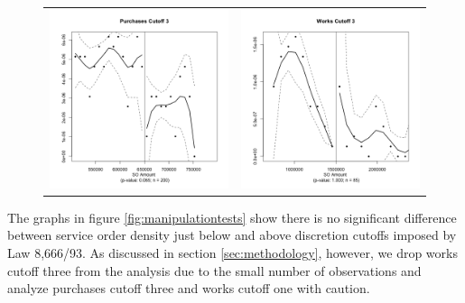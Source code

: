 \documentclass[11pt]{article}
\begin{document}
\begin{figure}[!htbp]
\begin{tabular}{cc}
  \includegraphics[scale=.41]{purchasesmanipulation3} & \includegraphics[scale=.41]{worksmanipulation3} \\
  \end{tabular}
\end{figure}

The graphs in figure \ref{fig:manipulationtests} show there is no significant difference between service order density just below and above discretion cutoffs imposed by Law 8,666/93. As discussed in section \ref{sec:methodology}, however, we drop works cutoff three from the analysis due to the small number of observations and analyze purchases cutoff three and works cutoff one with caution.
\end{document}
